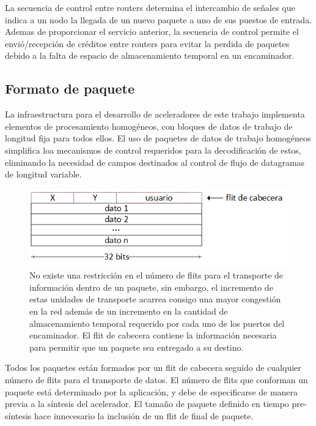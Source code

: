 La secuencia de control entre routers determina el intercambio de señales que indica a un nodo la llegada de un nuevo paquete a uno de sus puestos de entrada. Ademas de proporcionar el servicio anterior, la secuencia de control permite el envió/recepción de créditos entre routers para evitar la perdida de paquetes debido a la falta de espacio de almacenamiento temporal en un encaminador.










\subsection{Formato de paquete}
	\label{subsec:formato_de_paquete}

La infraestructura para el desarrollo de aceleradores de este trabajo implementa elementos de procesamiento homogéneos, con bloques de datos de trabajo de longitud fija para todos ellos. El uso de paquetes de datos de trabajo homogéneos simplifica loa mecanismos de control requeridos para la decodificación de estos, eliminando la necesidad de campos destinados al control de flujo de datagramas de longitud variable.

\begin{figure}
	\begin{center}
		\includegraphics[scale=0.8]{figures/ch4_organizacion_paquete.png}
	\end{center}
	\caption
		{	
			No existe una restricción en el número de flits para el transporte de información dentro de un paquete, sin embargo, el incremento de estas unidades de transporte acarrea consigo una mayor congestión en la red además de un incremento en la cantidad de almacenamiento temporal requerido por cada uno de los puertos del encaminador. El flit de cabecera contiene la información necesaria para permitir que un paquete sea entregado a su destino.
		}
	\label{fig:ch4_organizacion_paquete}
\end{figure}

Todos los paquetes están formados por un flit de cabecera seguido de cualquier número de flits para el transporte de datos. El número de flits que conforman un paquete está determinado por la aplicación, y debe de especificarse de manera previa a la síntesis del acelerador. El tamaño de paquete definido en tiempo pre-síntesis hace innecesario la inclusión de un flit de final de paquete.


